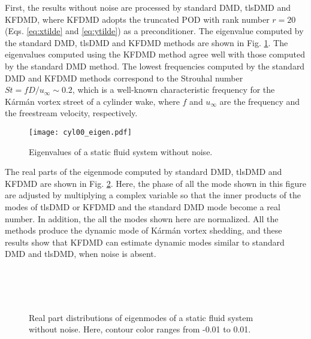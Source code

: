 \documentclass[aip,graphicx]{revtex4-1}
\begin{document}
First, the results without noise are processed by standard DMD, tlsDMD and KFDMD, where KFDMD adopts the truncated POD with rank number $r=20$ (Eqs. \ref{eq:xtilde} and \ref{eq:ytilde}) as a preconditioner. The eigenvalue computed by the standard DMD, tlsDMD and KFDMD methods are shown in Fig. \ref{fig:cyl_eigenwonoise}. The eigenvalues computed using the KFDMD method agree well with those computed by the standard DMD method. The lowest frequencies computed by the standard DMD and KFDMD methods correspond to the Strouhal number $St=fD/u_{\infty} \sim 0.2$, which is a well-known characteristic frequency for the K\'arm\'an vortex street of a cylinder wake, where $f$ and $u_\infty$ are the frequency and the freestream velocity, respectively. 

\begin{figure}
	\texttt{[image: cyl00\_eigen.pdf]}
	\caption{Eigenvalues of a static fluid system without noise.}
	 \label{fig:cyl_eigenwonoise}
\end{figure}

The real parts of the eigenmode computed by standard DMD, tlsDMD and KFDMD are shown in Fig. \ref{fig:cyl_eigenmodewonoise}. Here, the phase of all the mode shown in this figure are adjusted by multiplying a complex variable so that the inner products of the modes of tlsDMD or KFDMD and the standard DMD mode become a real number. In addition, the all the modes shown here are normalized. All the methods produce the dynamic mode of K\'arm\'an vortex shedding, and these results show that KFDMD can estimate dynamic modes similar to standard DMD and tlsDMD, when noise is absent. 

\begin{figure}
	\\
	\\
	\\
	\caption{Real part distributions of eigenmodes of a static fluid system without noise. Here, contour color ranges from -0.01 to 0.01.}
	\label{fig:cyl_eigenmodewonoise}
\end{figure}
\end{document}
